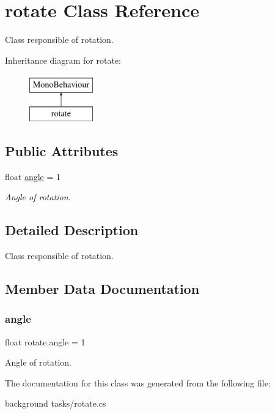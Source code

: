 \hypertarget{classrotate}{}\section{rotate Class Reference}
\label{classrotate}


Class responsible of rotation.  


Inheritance diagram for rotate\+:\begin{figure}[H]
\begin{center}
\leavevmode
\includegraphics[height=2.000000cm]{classrotate}
\end{center}
\end{figure}
\subsection*{Public Attributes}
\begin{DoxyCompactItemize}
\item 
float \mbox{\hyperlink{classrotate_aad45a318094d5f91273252034e63b78b}{angle}} = 1
\begin{DoxyCompactList}\small\item\em Angle of rotation. \end{DoxyCompactList}\end{DoxyCompactItemize}


\subsection{Detailed Description}
Class responsible of rotation. 



\subsection{Member Data Documentation}
\mbox{\label{classrotate_aad45a318094d5f91273252034e63b78b}} 
\subsubsection{\texorpdfstring{angle}{angle}}
{\footnotesize\ttfamily float rotate.\+angle = 1}



Angle of rotation. 



The documentation for this class was generated from the following file\+:\begin{DoxyCompactItemize}
\item 
background tasks/rotate.\+cs\end{DoxyCompactItemize}
